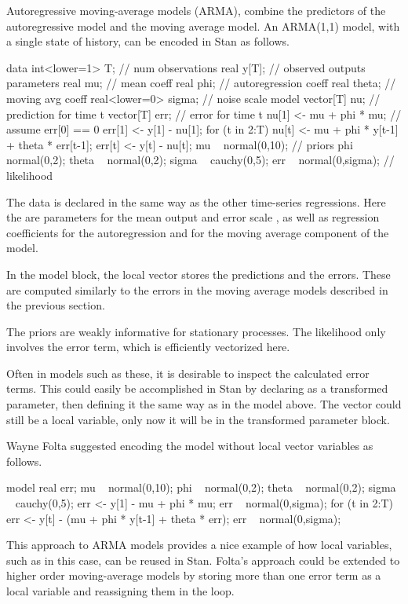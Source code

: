 Autoregressive moving-average models (ARMA), combine the predictors
of the autoregressive model and the moving average model.  An
ARMA(1,1) model, with a single state of history, can be encoded in
Stan as follows.
%
\begin{stancode}
data {
  int<lower=1> T;            // num observations
  real y[T];                 // observed outputs
}
parameters {
  real mu;                   // mean coeff
  real phi;                  // autoregression coeff
  real theta;                // moving avg coeff
  real<lower=0> sigma;       // noise scale
}
model {
  vector[T] nu;              // prediction for time t
  vector[T] err;             // error for time t
  nu[1] <- mu + phi * mu;    // assume err[0] == 0
  err[1] <- y[1] - nu[1];
  for (t in 2:T) {
    nu[t] <- mu + phi * y[t-1] + theta * err[t-1];
    err[t] <- y[t] - nu[t];
  }
  mu ~ normal(0,10);         // priors
  phi ~ normal(0,2);
  theta ~ normal(0,2);
  sigma ~ cauchy(0,5);
  err ~ normal(0,sigma);    // likelihood
}
\end{stancode}
%
The data is declared in the same way as the other time-series
regressions.  Here the are parameters for the mean output 
and error scale , as well as regression coefficients
 for the autoregression and  for the moving
average component of the model.  

In the model block, the local vector  stores the predictions
and  the errors.  These are computed similarly to the
errors in the moving average models described in the previous section.  

The priors are weakly informative for stationary processes.  The
likelihood only involves the error term, which is efficiently
vectorized here.

Often in models such as these, it is desirable to inspect the
calculated error terms.  This could easily be accomplished in Stan by
declaring  as a transformed parameter, then defining it the
same way as in the model above.  The vector  could still be a
local variable, only now it will be in the transformed parameter block.

Wayne Folta suggested encoding the model without local vector
variables as follows.
%
\begin{stancode}
model {
  real err;
  mu ~ normal(0,10);
  phi ~ normal(0,2);
  theta ~ normal(0,2);
  sigma ~ cauchy(0,5);
  err <- y[1] - mu + phi * mu;
  err ~ normal(0,sigma);
  for (t in 2:T) {
    err <- y[t] - (mu + phi * y[t-1] + theta * err); 
    err ~ normal(0,sigma);
  }
}
\end{stancode}
%
This approach to ARMA models provides a nice example of how local
variables, such as  in this case, can be reused in Stan.
Folta's approach could be extended to higher order moving-average
models by storing more than one error term as a local variable and
reassigning them in the loop.  

